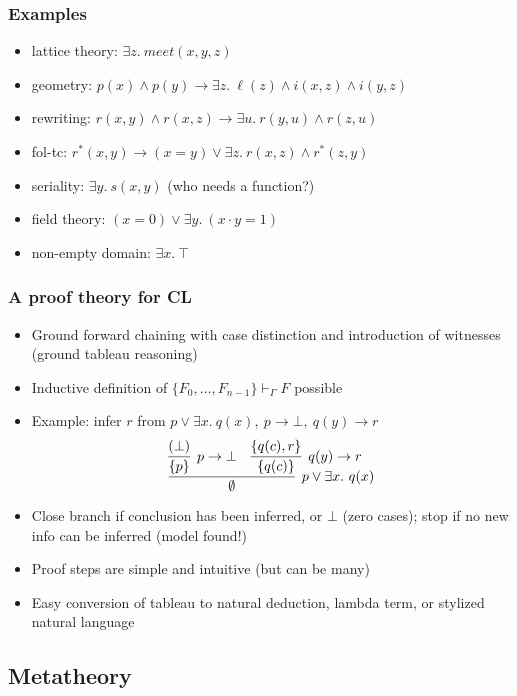 \documentclass[handout,11pt]{beamer}
\newcommand{\set}[1]{\{#1\}}
\begin{document}
\begin{frame}
\frametitle{Examples}
 \begin{itemize}[<+->]   %
    \item lattice theory: $%
    \exists z.~\mathit{meet}(x,y,z)$
    \item geometry: $%
    p(x)\land p(y) \to \exists z.~\ell(z) \land i(x,z) \land i(y,z)$
    \item rewriting: $%
    r(x,y)\land r(x,z) \to \exists u.~r(y,u)\land r(z,u)$
    \item fol-tc: $%
    r^*(x,y)\to (x=y)\lor\exists z.~r(x,z)\land r^*(z,y)$     
    \item seriality: $%
    \exists y.~s(x,y)$ (who needs a function?)
    \item field theory: $%
    (x=0) \lor \exists y.~(x\cdot y=1)$
    \item non-empty domain: $\exists x.~\top$
 \end{itemize}
\end{frame}

\begin{frame}
\frametitle{A proof theory for CL}
 \begin{itemize}[<+->]   %
    \item Ground forward chaining with case distinction and introduction of witnesses
(ground tableau reasoning)
    \item Inductive definition of $\set{F_0,\ldots,F_{n-1}}\vdash_\Gamma F$ possible %
    \item Example: infer $r$ from $p\lor \exists x.~q(x),~p\to\bot,~q(y)\to r$
    \[
\infer[p\vee \exists x.~q(x)]{\emptyset}
{
\infer[p\to\bot]{\set{p}}{(\bot)} & \infer[q(y)\to r]{\set{q(c)}}{\set{q(c),r}}
}
\]
    \item Close branch if conclusion has been inferred,
    or $\bot$ (zero cases); stop if no new info can be inferred (model found!) 
    \item Proof steps are simple and intuitive (but can be many)
    \item Easy conversion of tableau to natural deduction, lambda term, or stylized natural language
 \end{itemize}
\end{frame}

\subsection{Metatheory}
\end{document}
